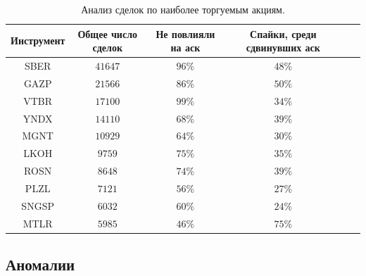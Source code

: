 \begin{table}[h!]
    \begin{center}
        \begin{tabular}{|c|c|c|c|c|c|}
            \hline
        Инструмент   & Общее число сделок & Не повлияли на аск & Спайки, среди сдвинувших аск \\ \hline
        SBER &  $41647$  & $ 96\% $ &  $ 48\% $\\ \hline
        GAZP &  $21566$  & $ 86\% $  & $ 50\% $ \\ \hline
        VTBR &  $17100$  & $ 99\% $ &  $ 34\%$ \\ \hline
        YNDX &  $14110$  & $ 68\% $  & $ 39\% $ \\ \hline
        MGNT &  $10929$  & $ 64\% $  & $ 30\% $ \\ \hline
        LKOH &  $9759 $ &  $ 75\% $ &  $ 35\% $\\ \hline
        ROSN &  $8648 $ &  $ 74\% $ &  $ 39\%$ \\ \hline
        PLZL &  $7121 $ &  $ 56\% $ &  $ 27\% $\\ \hline
        SNGSP & $ 6032$  & $ 60\% $  & $ 24\% $ \\ \hline
        MTLR &  $5985 $ &  $ 46\% $ &  $ 75\%$\\ \hline
        \end{tabular}
    \end{center}
    \label{tableanalSE}
    \caption{Анализ сделок по наиболее торгуемым акциям.}
\end{table} 




\subsection{Аномалии}

